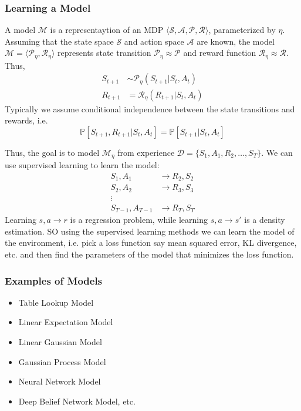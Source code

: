 \subsubsection{Learning a Model}
A model \(\mathcal{M}\) is a representaytion of an MDP \(\langle \mathcal{S}, \mathcal{A},
\mathcal{P}, \mathcal{R} \rangle\), parameterized by \(\eta\). Assuming that the state space
\(\mathcal{S}\) and action space \(\mathcal{A}\) are known, the model \(\mathcal{M} = \langle
\mathcal{P}_\eta, \mathcal{R}_\eta \rangle\) represents state transition 
\(\mathcal{P} _\eta \approx \mathcal{P}\) and reward function \(\mathcal{R}_\eta \approx
\mathcal{R}\). Thus,
\[
    \begin{aligned}
        S_{t+1} &\sim \mathcal{P}_\eta(S_{t+1}  | S_t, A_t) \\
        R_{t+1} &= \mathcal{R}_\eta(R_{t+1} | S_t, A_t)
    \end{aligned}        
\]
Typically we assume conditional independence between the state transitions and rewards, i.e.
\[
    \mathbb{P}\left[ S_{t+1}, R_{t+1} | S_t, A_t \right] = \mathbb{P}\left[ S_{t+1} | S_t, A_t \right]
\]

Thus, the goal is to model \(\mathcal{M} _\eta \) from experience \(\mathcal{D} = \{ S_1, A_1, R_2,
\ldots, S_T \}\). We can use supervised learning to learn the model:
\[
    \begin{aligned}
        S_1, A_1 &\rightarrow R_2, S_2 \\
        S_2, A_2 &\rightarrow R_3, S_3 \\
        \vdots & \\
        S_{T-1}, A_{T-1} &\rightarrow R_T, S_T
    \end{aligned}
\]
Learning \(s,a \to r\) is a regression problem, while learning \(s,a \to s'\) is a density estimation. SO 
using the supervised learning methods we can learn the model of the environment, i.e. pick a loss function say
mean squared error, KL divergence, etc. and then find the parameters of the model that minimizes the loss function.

\subsubsection*{Examples of Models}
\begin{itemize}
    \item Table Lookup Model
    \item Linear Expectation Model
    \item Linear Gaussian Model
    \item Gaussian Process Model
    \item Neural Network Model
    \item Deep Belief Network Model, etc.
\end{itemize}

